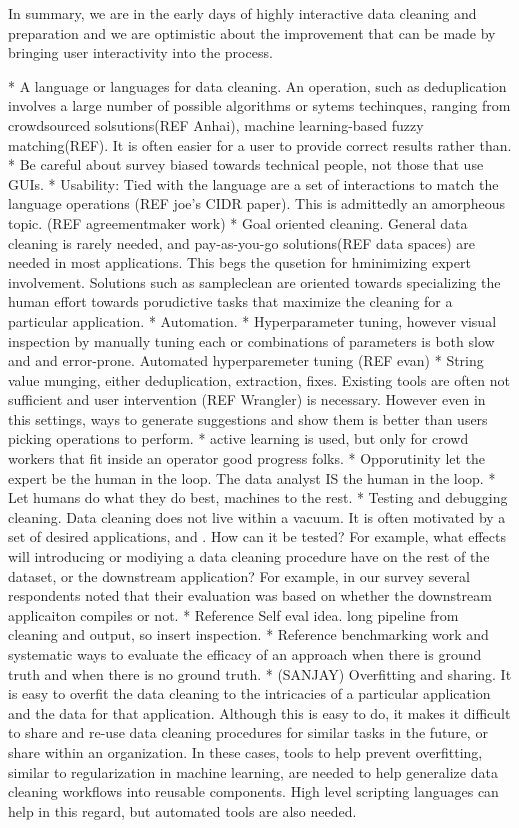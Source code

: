 In summary, we are in the early days of highly interactive data cleaning and preparation and we are optimistic about the improvement that can be made by bringing user interactivity into the process.


 
* A language or languages for data cleaning.  An operation, such as deduplication involves a large number of possible algorithms or sytems techinques, ranging from crowdsourced solsutions(REF Anhai), machine learning-based fuzzy matching(REF).  It is often easier for a user to provide correct results rather than.
* Be careful about survey biased towards technical people, not those that use GUIs. 
* Usability: Tied with the language are a set of interactions to match the language operations (REF joe’s CIDR paper).  This is admittedly an amorpheous topic.  (REF agreementmaker work)
* Goal oriented cleaning.  General data cleaning is rarely needed, and pay-as-you-go solutions(REF data spaces) are needed in most applications.   This begs the qusetion for hminimizing expert involvement.   Solutions such as sampleclean are oriented towards specializing the human effort towards porudictive tasks that maximize the cleaning for a particular application.  
* Automation. 
    * Hyperparameter tuning, however visual inspection by manually tuning each or combinations of parameters is both slow and and error-prone.  Automated hyperparemeter tuning (REF evan)
    * String value munging, either deduplication, extraction, fixes.  Existing tools are often not sufficient and user intervention (REF Wrangler) is necessary.  However even in this settings, ways to generate suggestions and show them is better than users picking operations to perform.
    * active learning is used, but only for crowd workers that fit inside an operator good progress folks.
    * Opporutinity let the expert be the human in the loop.  The data analyst IS the human in the loop.
    * Let humans do what they do best, machines to the rest.
* Testing and debugging cleaning.  Data cleaning does not live within a vacuum.  It is often motivated by a set of desired applications, and .  How can it be tested?  For example, what effects will introducing or modiying a data cleaning procedure have on the rest of the dataset, or the downstream application?  For example, in our survey several respondents noted that their evaluation was based on whether the downstream applicaiton compiles or not.
    * Reference Self eval idea.  long pipeline from cleaning and output, so insert inspection.  
    * Reference benchmarking work and systematic ways to evaluate the efficacy of an approach when there is ground truth and when there is no ground truth.
* (SANJAY) Overfitting and sharing.   It is easy to overfit the data cleaning to the intricacies of a particular application and the data for that application.  Although this is easy to do, it makes it difficult to share and re-use data cleaning procedures for similar tasks in the future, or share within an organization.  In these cases, tools to help prevent overfitting, similar to regularization in machine learning, are needed to help generalize data cleaning workflows into reusable components.  High level scripting languages can help in this regard, but automated tools are also needed.




